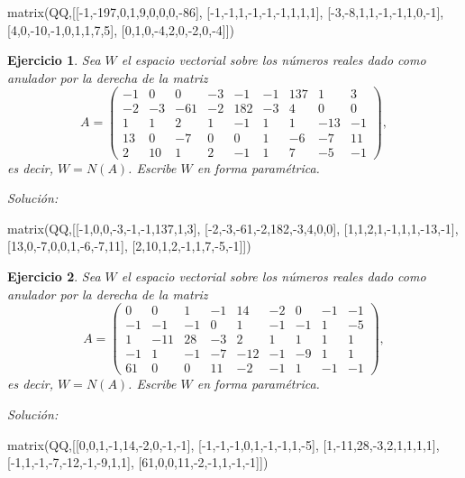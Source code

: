 \documentclass{amsart}
\newtheorem{ejer}{Ejercicio}
\begin{document}
\begin{sageblock}
matrix(QQ,[[-1,-197,0,1,9,0,0,0,-86],
[-1,-1,1,-1,-1,-1,1,1,1],
[-3,-8,1,1,-1,-1,1,0,-1],
[4,0,-10,-1,0,1,1,7,5],
[0,1,0,-4,2,0,-2,0,-4]])
\end{sageblock}



\begin{ejer} Sea $W$ el espacio vectorial sobre los números reales dado
como anulador por la derecha de la matriz 
\[A = \left(\begin{array}{rrrrrrrrr}
-1 & 0 & 0 & -3 & -1 & -1 & 137 & 1 & 3 \\
-2 & -3 & -61 & -2 & 182 & -3 & 4 & 0 & 0 \\
1 & 1 & 2 & 1 & -1 & 1 & 1 & -13 & -1 \\
13 & 0 & -7 & 0 & 0 & 1 & -6 & -7 & 11 \\
2 & 10 & 1 & 2 & -1 & 1 & 7 & -5 & -1
\end{array}\right),\]
es decir, $W = N(A)$. Escribe $W$ en forma param\'etrica.
\end{ejer}

{\it Soluci\'on:}

\begin{sageblock}
matrix(QQ,[[-1,0,0,-3,-1,-1,137,1,3],
[-2,-3,-61,-2,182,-3,4,0,0],
[1,1,2,1,-1,1,1,-13,-1],
[13,0,-7,0,0,1,-6,-7,11],
[2,10,1,2,-1,1,7,-5,-1]])
\end{sageblock}



\begin{ejer} Sea $W$ el espacio vectorial sobre los números reales dado
como anulador por la derecha de la matriz 
\[A = \left(\begin{array}{rrrrrrrrr}
0 & 0 & 1 & -1 & 14 & -2 & 0 & -1 & -1 \\
-1 & -1 & -1 & 0 & 1 & -1 & -1 & 1 & -5 \\
1 & -11 & 28 & -3 & 2 & 1 & 1 & 1 & 1 \\
-1 & 1 & -1 & -7 & -12 & -1 & -9 & 1 & 1 \\
61 & 0 & 0 & 11 & -2 & -1 & 1 & -1 & -1
\end{array}\right),\]
es decir, $W = N(A)$. Escribe $W$ en forma param\'etrica.
\end{ejer}

{\it Soluci\'on:}

\begin{sageblock}
matrix(QQ,[[0,0,1,-1,14,-2,0,-1,-1],
[-1,-1,-1,0,1,-1,-1,1,-5],
[1,-11,28,-3,2,1,1,1,1],
[-1,1,-1,-7,-12,-1,-9,1,1],
[61,0,0,11,-2,-1,1,-1,-1]])
\end{sageblock}
\end{document}
